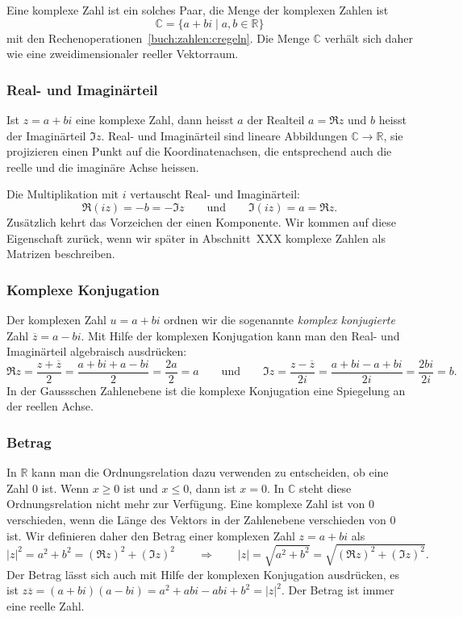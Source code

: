 Eine komplexe Zahl ist ein solches Paar, die Menge der komplexen Zahlen
ist
\[
\mathbb{C}
=
\{a+bi\;|\;a,b\in\mathbb{R}\}
\]
mit den Rechenoperationen~\eqref{buch:zahlen:cregeln}.
Die Menge $\mathbb{C}$ verhält sich daher wie eine zweidimensionaler
reeller Vektorraum.

\subsubsection{Real- und Imaginärteil}
Ist $z=a+bi$ eine komplexe Zahl, dann heisst $a$ der Realteil $a=\Re z$
und $b$ heisst der Imaginärteil $\Im z$.
Real- und Imaginärteil sind lineare Abbildungen $\mathbb{C}\to\mathbb{R}$,
sie projizieren einen Punkt auf die Koordinatenachsen, die entsprechend
auch die reelle und die imaginäre Achse heissen.

Die Multiplikation mit $i$ vertauscht Real- und Imaginärteil:
\[
\Re (iz)
=
-b
=
-\Im z
\qquad\text{und}\qquad
\Im (iz)
=
a
=
\Re z.
\]
Zusätzlich kehrt das Vorzeichen der einen Komponente.
Wir kommen auf diese Eigenschaft zurück, wenn wir später in Abschnitt~XXX
komplexe Zahlen als Matrizen beschreiben.

\subsubsection{Komplexe Konjugation}
Der komplexen Zahl $u=a+bi$ ordnen wir die sogenannte
{\em komplex konjugierte} Zahl $\overline{z} = a-bi$.
Mit Hilfe der komplexen Konjugation kann man den Real- und Imaginärteil
algebraisch ausdrücken:
\[
\Re z 
=
\frac{z+\overline{z}}2
=
\frac{a+bi+a-bi}{2}
=
\frac{2a}2
=a
\qquad\text{und}\qquad
\Im z
=
\frac{z-\overline{z}}{2i}
=
\frac{a+bi-a+bi}{2i}
=
\frac{2bi}{2i}
=
b.
\]
In der Gaussschen Zahlenebene ist die komplexe Konjugation eine
Spiegelung an der reellen Achse.

\subsubsection{Betrag}
In $\mathbb{R}$ kann man die Ordnungsrelation dazu verwenden zu entscheiden,
ob eine Zahl $0$ ist. 
Wenn $x\ge 0$ ist und $x\le 0$, dann ist $x=0$.
In $\mathbb{C}$ steht diese Ordnungsrelation nicht mehr zur Verfügung.
Eine komplexe Zahl ist von $0$ verschieden, wenn die Länge des Vektors in der
Zahlenebene verschieden von $0$ ist.
Wir definieren daher den Betrag einer komplexen Zahl $z=a+bi$ als
\[
|z|^2
=
a^2 +b^2
=
(\Re z)^2 + (\Im z)^2
\qquad\Rightarrow\qquad
|z|
=
\sqrt{a^2+b^2}
=
\sqrt{(\Re z)^2 + (\Im z)^2}.
\]
Der Betrag lässt sich auch mit Hilfe der komplexen Konjugation ausdrücken,
es ist $z\overline{z} = (a+bi)(a-bi) = a^2+abi-abi+b^2 = |z|^2$.
Der Betrag ist immer eine reelle Zahl.

